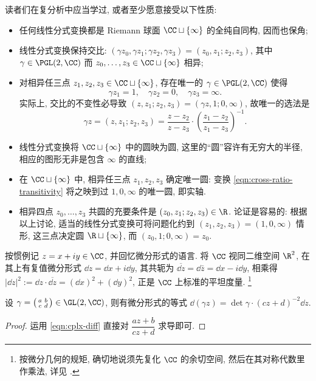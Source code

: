 读者们在复分析中应当学过, 或者至少愿意接受以下性质:
\begin{itemize}
	\item 任何线性分式变换都是 Riemann 球面 $\CC \sqcup \{\infty\}$ 的全纯自同构, 因而也保角;
	\item 线性分式变换保持交比: $(\gamma z_0, \gamma z_1; \gamma z_2, \gamma z_3) = (z_0, z_1; z_2, z_3)$, 其中 $\gamma \in \PGL(2,\CC)$ 而 $z_0, \ldots, z_3 \in \CC \sqcup \{\infty\}$ 相异;
	\item 对相异任三点 $z_1, z_2, z_3 \in \CC \sqcup \{\infty\}$, 存在唯一的 $\gamma \in \PGL(2,\CC)$ 使得
	\[ \gamma z_1 = 1, \quad \gamma z_2 = 0, \quad \gamma z_3 = \infty. \]
	实际上, 交比的不变性必导致 $(z, z_1; z_2, z_3) = (\gamma z, 1; 0, \infty)$, 故唯一的选法是
	\begin{equation}\label{eqn:cross-ratio-transitivity}
		\gamma z = (z, z_1; z_2, z_3) = \frac{z - z_2}{z - z_3} \cdot \left(\frac{z_1 - z_2}{z_1 - z_3}\right)^{-1}.
	\end{equation}
	\item 线性分式变换将 $\CC \sqcup \{\infty\}$ 中的圆映为圆, 这里的``圆''容许有无穷大的半径, 相应的图形无非是包含 $\infty$ 的直线;
	\item 在 $\CC \sqcup \{\infty\}$ 中, 相异任三点 $z_1, z_2, z_3$ 确定唯一圆: 变换 \eqref{eqn:cross-ratio-transitivity} 将之映到过 $1,0,\infty$ 的唯一圆, 即实轴. 
	\item 相异四点 $z_0, \ldots, z_3$ 共圆的充要条件是 $(z_0, z_1; z_2, z_3) \in \R$. 论证是容易的: 根据以上讨论, 适当的线性分式变换可将问题化约到 $(z_1, z_2, z_3) = (1, 0, \infty)$ 情形, 这三点决定圆 $\R \sqcup \{\infty\}$, 而 $(z_0, 1; 0, \infty) = z_0$.
\end{itemize}

按惯例记 $z = x + iy \in \CC$, 并回忆微分形式的语言. 将 $\CC$ 视同二维空间 $\R^2$, 在其上有复值微分形式 $\dd z = \dd x + i\dd y$, 其共轭为 $\overline{\dd z} = \dd\bar{z} = \dd x - i\dd y$, 相乘得 $|\dd z|^2 := \dd z \cdot \overline{\dd z} = (\dd x)^2 + (\dd y)^2$, 正是 $\CC$ 上标准的平坦度量.
\footnote{按微分几何的规矩, 确切地说须先复化 $\CC$ 的余切空间, 然后在其对称代数里作乘法, 详见 \cite[\S 7.6]{Li1}.}

\begin{lemma}\label{prop:fractional-transform-d}
	设 $\gamma = \bigl( \begin{smallmatrix} a & b \\ c & d \end{smallmatrix} \bigr) \in \GL(2,\CC)$, 则有微分形式的等式 $\dd(\gamma z) = \det\gamma \cdot (cz+d)^{-2} \dd z$.
\end{lemma}
\begin{proof}
	运用 \eqref{eqn:cplx-diff} 直接对 $\dfrac{az+b}{cz+d}$ 求导即可.
\end{proof}


